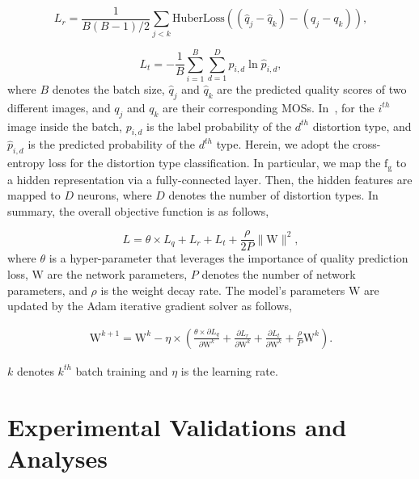 \begin{equation}
	\label{ranking}
	L_{r}=\frac{1}{B(B-1)/2}\sum_{j< k}{\mathrm{HuberLoss}}\left((\hat{q}_{j}-\hat{q}_{k})-(q_{j}-q_{k})\right),
\end{equation}

\begin{equation}
	L_{t}=-\frac{1}{B}\sum_{i=1}^{B} \sum_{d=1}^{D} p_{i, d} \ln \hat{p}_{i, d},
	\label{type}
\end{equation}
where $B$ denotes the batch size, $\hat{q}_{j}$ and $\hat{q}_{k}$ are the predicted quality scores of two different images, and $q_{j}$ and $q_{k}$ are their corresponding MOSs. In~, for the $i^{th}$ image inside the batch, $p_{i, d}$ is the label probability of the $d^{th}$ distortion type, and $\hat{p}_{i, d}$ is the predicted probability of the $d^{th}$ type. Herein, we adopt the cross-entropy loss for the distortion type classification. In particular, we map the $\boldsymbol{\mathrm{f_{g}}}$ to a hidden representation via a fully-connected layer. Then, the hidden features are mapped to $D$ neurons, where $D$ denotes the number of distortion types. In summary, the overall objective function is as follows,

\begin{equation}
	L = \theta \times L_{q} + L_{r} + L_{t} + \frac{\rho}{2P}\|{\boldsymbol{\mathrm W}}\|^{2},
	\label{loss}
\end{equation}
where $\theta$ is a hyper-parameter that leverages the importance of quality prediction loss, ${\boldsymbol{\mathrm W}}$ are the network parameters, $P$ denotes the number of network parameters, and $\rho$ is the weight decay rate. The model's parameters ${\boldsymbol{\mathrm W}}$ are updated by the Adam iterative gradient solver as follows,

\begin{align}
	{\boldsymbol{\mathrm W}}^{k+1}={\boldsymbol{\mathrm W}}^{k}-\eta\times\left(\frac{\theta\times\partial L_{q}}{\partial {\boldsymbol{\mathrm W}}^{k}}+\frac{\partial L_{r}}{\partial {\boldsymbol{\mathrm W}}^{k}}+\frac{\partial L_{t}}{\partial {\boldsymbol{\mathrm W}}^{k}}+\frac{\rho}{P}{\boldsymbol{\mathrm W}}^{k}\right).
\end{align}

\indent$k$ denotes $k^{th}$ batch training and $\eta$ is the learning rate.

\section{Experimental Validations and Analyses}
